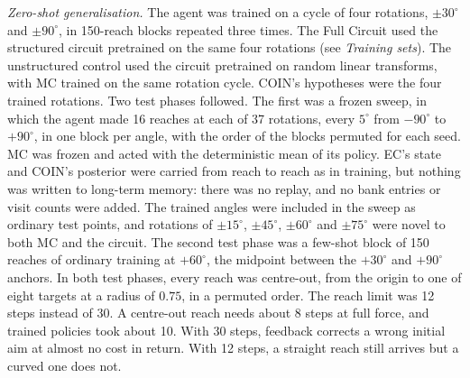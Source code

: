 \textit{Zero-shot generalisation.} The agent was trained on a cycle of four rotations, $\pm 30^\circ$ and $\pm 90^\circ$, in 150-reach blocks repeated three times. The Full Circuit used the structured circuit pretrained on the same four rotations (see \textit{Training sets}). The unstructured control used the circuit pretrained on random linear transforms, with MC trained on the same rotation cycle. COIN's hypotheses were the four trained rotations. Two test phases followed. The first was a frozen sweep, in which the agent made 16 reaches at each of 37 rotations, every $5^\circ$ from $-90^\circ$ to $+90^\circ$, in one block per angle, with the order of the blocks permuted for each seed. MC was frozen and acted with the deterministic mean of its policy. EC's state and COIN's posterior were carried from reach to reach as in training, but nothing was written to long-term memory: there was no replay, and no bank entries or visit counts were added. The trained angles were included in the sweep as ordinary test points, and rotations of $\pm 15^\circ$, $\pm 45^\circ$, $\pm 60^\circ$ and $\pm 75^\circ$ were novel to both MC and the circuit. The second test phase was a few-shot block of 150 reaches of ordinary training at $+60^\circ$, the midpoint between the $+30^\circ$ and $+90^\circ$ anchors. In both test phases, every reach was centre-out, from the origin to one of eight targets at a radius of $0.75$, in a permuted order. The reach limit was 12 steps instead of 30. A centre-out reach needs about 8 steps at full force, and trained policies took about 10. With 30 steps, feedback corrects a wrong initial aim at almost no cost in return. With 12 steps, a straight reach still arrives but a curved one does not.

